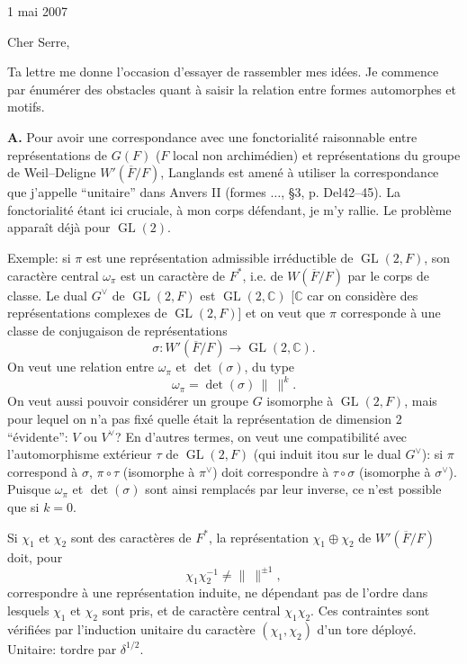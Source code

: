 \documentclass[11pt]{article}
\newcommand{\GL}{\operatorname{GL}}
\newcommand{\Fbar}{\overline F}
\newcommand{\normchar}{\|\ \|}
\begin{document}
\thispagestyle{empty}

\begin{flushright}
1 mai 2007
\end{flushright}

Cher Serre,

Ta lettre me donne l'occasion d'essayer de rassembler mes idées. Je commence par énumérer des obstacles quant à saisir la relation entre formes automorphes et motifs.

\textbf{A.} Pour avoir une correspondance avec une fonctorialité raisonnable entre représentations de \(G(F)\) (\(F\) local non archimédien) et représentations du groupe de Weil--Deligne \(W'(\Fbar/F)\), Langlands est amené à utiliser la correspondance que j'appelle ``unitaire'' dans Anvers II (formes \(\ldots\), \S3, p. Del42--45). La fonctorialité étant ici cruciale, à mon corps défendant, je m'y rallie. Le problème apparaît déjà pour \(\GL(2)\).

Exemple: si \(\pi\) est une représentation admissible irréductible de \(\GL(2,F)\), son caractère central \(\omega_\pi\) est un caractère de \(F^\ast\), i.e. de \(W(\Fbar/F)\) par le corps de classe. Le dual \(G^\vee\) de \(\GL(2,F)\) est \(\GL(2,\mathbb C)\) [\(\mathbb C\) car on considère des représentations complexes de \(\GL(2,F)\)] et on veut que \(\pi\) corresponde à une classe de conjugaison de représentations
\[
\sigma:W'(\Fbar/F)\longrightarrow \GL(2,\mathbb C).
\]
On veut une relation entre \(\omega_\pi\) et \(\det(\sigma)\), du type
\[
\omega_\pi=\det(\sigma)\,\normchar^k.
\]
On veut aussi pouvoir considérer un groupe \(G\) isomorphe à \(\GL(2,F)\), mais pour lequel on n'a pas fixé quelle était la représentation de dimension \(2\) ``évidente'': \(V\) ou \(V^\vee\)? En d'autres termes, on veut une compatibilité avec l'automorphisme extérieur \(\tau\) de \(\GL(2,F)\) (qui induit itou sur le dual \(G^\vee\)): si \(\pi\) correspond à \(\sigma\), \(\pi\circ\tau\) (isomorphe à \(\pi^\vee\)) doit correspondre à \(\tau\circ\sigma\) (isomorphe à \(\sigma^\vee\)). Puisque \(\omega_\pi\) et \(\det(\sigma)\) sont ainsi remplacés par leur inverse, ce n'est possible que si \(k=0\).

Si \(\chi_1\) et \(\chi_2\) sont des caractères de \(F^\ast\), la représentation \(\chi_1\oplus\chi_2\) de \(W'(\Fbar/F)\) doit, pour
\[
\chi_1\chi_2^{-1}\ne \normchar^{\pm1},
\]
correspondre à une représentation induite, ne dépendant pas de l'ordre dans lesquels \(\chi_1\) et \(\chi_2\) sont pris, et de caractère central \(\chi_1\chi_2\). Ces contraintes sont vérifiées par l'induction unitaire du caractère \((\chi_1,\chi_2)\) d'un tore déployé. Unitaire: tordre par \(\delta^{1/2}\).
\end{document}
